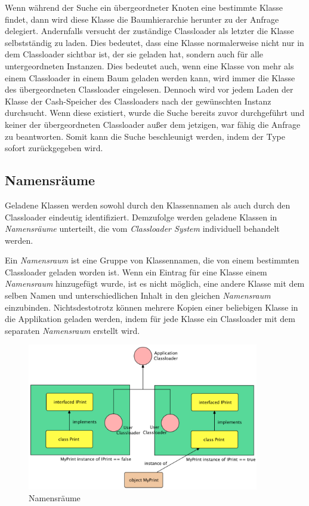     Wenn während der Suche ein übergeordneter Knoten eine bestimmte Klasse findet, dann wird diese Klasse die Baumhierarchie herunter zu der Anfrage delegiert. Andernfalls versucht der zuständige Classloader als letzter die Klasse selbstständig zu laden. Dies bedeutet, dass eine Klasse normalerweise nicht nur in dem Classloader sichtbar ist, der sie geladen hat, sondern auch für alle untergeordneten Instanzen. Dies bedeutet auch, wenn eine Klasse von mehr als einem Classloader in einem Baum geladen werden kann, wird immer die Klasse des übergeordneten Classloader eingelesen. Dennoch wird vor jedem Laden der Klasse der Cash-Speicher des Classloaders nach der gewünschten Instanz durchsucht. Wenn diese existiert, wurde die Suche bereits zuvor durchgeführt und keiner der übergeordneten Classloader außer dem jetzigen, war fähig die Anfrage zu beantworten. Somit kann die Suche beschleunigt werden, indem der Type sofort zurückgegeben wird.


  \subsection{Namensräume} \label{sec:nam}

    Geladene Klassen werden sowohl durch den Klassennamen als auch durch den Classloader eindeutig identifiziert. Demzufolge werden geladene Klassen in \textit{Namensräume} unterteilt, die vom \textit{Classloader System} individuell behandelt werden. 

    Ein \textit{Namensraum} ist eine Gruppe von Klassennamen, die von einem bestimmten Classloader geladen worden ist. Wenn ein Eintrag für eine Klasse einem \textit{Namensraum} hinzugefügt wurde, ist es nicht möglich, eine andere Klasse mit dem selben Namen und unterschiedlichen Inhalt in den gleichen \textit{Namensraum} einzubinden. Nichtsdestotrotz können mehrere Kopien einer beliebigen Klasse in die Applikation geladen werden, indem für jede Klasse ein Classloader mit dem separaten \textit{Namensraum} erstellt wird. 

    \begin{figure}[h]
      \centering
      \includegraphics[width=0.9\textwidth]{material/images/namespaces.png}
      \caption{Namensräume}
      \label{fig:nam}
    \end{figure}

